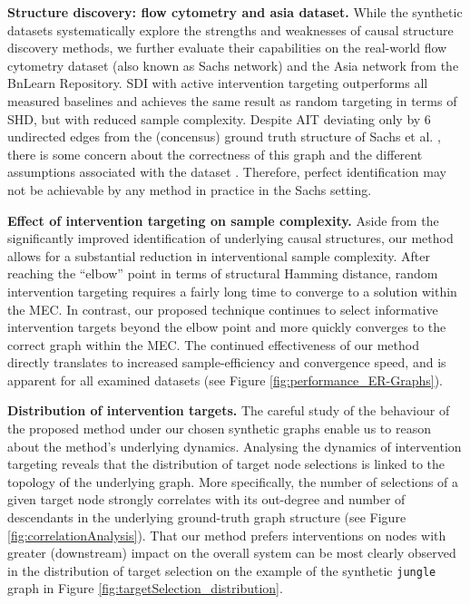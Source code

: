 \documentclass[nohyperref]{article}
\theoremstyle{plain}
\theoremstyle{definition}
\theoremstyle{remark}
\begin{document}
\textbf{Structure  discovery: flow cytometry and asia dataset.} While the synthetic datasets systematically explore the strengths and weaknesses of causal structure discovery methods, we further evaluate their capabilities on the real-world flow cytometry dataset (also known as Sachs network)\citep{sachs2005causal} and the Asia network \citep{lauritzen1988local} from the BnLearn Repository. SDI with active intervention targeting outperforms all measured baselines and achieves the same result as random targeting in terms of SHD, but with reduced sample complexity.  Despite AIT deviating only by 6 undirected edges from the (concensus) ground truth structure of Sachs et al. \citep{sachs2005causal}, there is some concern about the correctness of this graph and the different assumptions associated with the dataset \citep{mooij2020jointcausal, zemplenyi2021bayesian}. Therefore, perfect identification may not be achievable by any method in practice in the Sachs setting.



\textbf{Effect of intervention targeting on sample complexity.}
\label{sec:results_effectOfAIT}Aside from the significantly improved identification of underlying causal structures, our method allows for a substantial reduction in interventional sample complexity. After reaching the ``elbow'' point in terms of structural Hamming distance, random intervention targeting requires a fairly long time to converge to a solution within the MEC. In contrast, our proposed technique continues to select informative intervention targets beyond the elbow point and more quickly converges to the correct graph within the MEC. The continued effectiveness of our method directly translates to increased sample-efficiency and convergence speed, and is apparent for all examined datasets (see Figure \ref{fig:performance_ER-Graphs}).



\textbf{Distribution of intervention targets.}
The careful study of the behaviour of the proposed method under our chosen synthetic graphs enable us to reason about the method's underlying dynamics. Analysing the dynamics of intervention targeting reveals that the distribution of target node selections is linked to the topology of the underlying graph. More specifically, the number of selections of a given target node strongly correlates with its out-degree and number of descendants in the underlying ground-truth graph structure (see Figure \ref{fig:correlationAnalysis}). That our method prefers interventions on nodes with greater (downstream) impact on the overall system can be most clearly observed in the distribution of target selection on the example of the synthetic \texttt{jungle} graph in Figure \ref{fig:targetSelection_distribution}.
\end{document}
